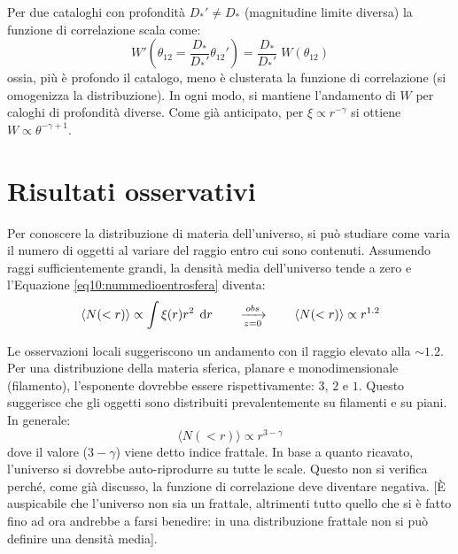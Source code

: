 Per due cataloghi con profondità $D_*'\neq D_*$ (magnitudine limite diversa) la funzione di correlazione scala come:
\begin{equation*}
    W'\left(\theta_{12}=\frac{D_*}{D_*'}\theta_{12}'\right)=\frac{D_*}{D_*'}\; W(\theta_{12})
\end{equation*}
ossia, più è profondo il catalogo, meno è clusterata la funzione di correlazione (si omogenizza la distribuzione). In ogni modo, si mantiene l'andamento di $W$ per caloghi di profondità diverse. Come già anticipato, per $\xi \propto r^{-\gamma}$ si ottiene $W\propto \theta^{-\gamma +1}$.

\section{Risultati osservativi}
Per conoscere la distribuzione di materia dell'universo, si può studiare come varia il numero di oggetti al variare del raggio entro cui sono contenuti. Assumendo raggi sufficientemente grandi, la densità media dell'universo tende a zero e l'Equazione \ref{eq10:nummedioentrosfera} diventa:
\begin{equation}
    \langle N(<r)\rangle \propto \int \xi(r) r^2\; \operatorname{d}\!{r} \qquad \xrightarrow[z=0]{obs} \qquad \langle N(<r)\rangle \propto r^{1.2}
\end{equation}

Le osservazioni locali suggeriscono un andamento con il raggio elevato alla $\sim 1.2$. Per una distribuzione della materia sferica, planare e monodimensionale (filamento), l'esponente dovrebbe essere rispettivamente: $3$, $2$ e $1$. Questo suggerisce che gli oggetti sono distribuiti prevalentemente su filamenti e su piani. In generale:
\begin{equation}
    \langle N(<r)\rangle \propto r^{3-\gamma}
\end{equation}
dove il valore ($3-\gamma$) viene detto indice frattale. In base a quanto ricavato, l'universo si dovrebbe auto-riprodurre su tutte le scale. Questo non si verifica perché, come già discusso, la funzione di correlazione deve diventare negativa. [È auspicabile che l'universo non sia un frattale, altrimenti tutto quello che si è fatto fino ad ora andrebbe a farsi benedire: in una distribuzione frattale non si può definire una densità media].

